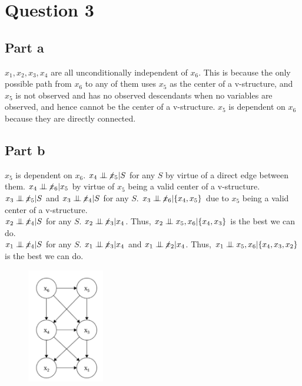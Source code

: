 \section{Question 3}
\subsection{Part a}
$x_1, x_2, x_3, x_4$ are all unconditionally independent of $x_6$. This is because the only possible path from $x_6$ to any of them uses $x_5$ as the center of a v-structure, and $x_5$ is not observed and has no observed descendants when no variables are observed, and hence cannot be the center of a v-structure. $x_5$ is dependent on $x_6$ because they are directly connected.  

\subsection{Part b}
$x_5$ is dependent on $x_6$. $x_4 \notindependent x_5 | S$ for any $S$ by virtue of a direct edge between them. $x_4 \notindependent x_6 | x_5$ by virtue of $x_5$ being a valid center of a v-structure.\\
$x_3 \notindependent x_5 | S$ and $x_3 \notindependent x_4 | S$ for any $S$.  $x_3 \notindependent x_6 | \{x_4, x_5\}$ due to $x_5$ being a valid center of a v-structure.\\
$x_2 \notindependent x_4 | S$ for any $S$. $x_2 \notindependent x_3 | x_4$. Thus, $x_2 \perp\mkern-9.5mu\perp x_5, x_6 | \{x_4, x_3\}$ is the best we can do.\\
$x_1 \notindependent x_4 | S$ for any $S$. $x_1 \notindependent x_3 | x_4$ and $x_1 \notindependent x_2 | x_4$. Thus, $x_1 \perp\mkern-9.5mu\perp x_5, x_6 | \{x_4, x_3, x_2\}$ is the best we can do.\\

\begin{figure}[H]
    \centering
    \includegraphics[width=0.3\textwidth]{../images/BN_Q3.png}
\end{figure}
